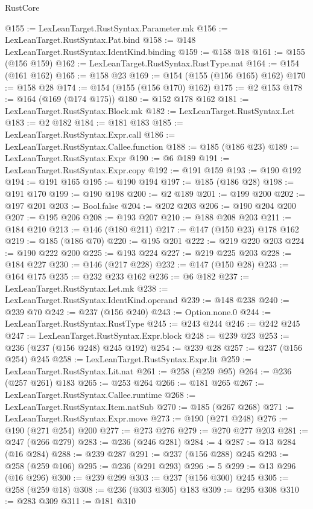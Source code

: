 \begin{lexlean}{RustCore}
\begin{coremodule}
@155 := LexLeanTarget.RustSyntax.Parameter.mk
@156 := LexLeanTarget.RustSyntax.Pat.bind
@158 := @148 LexLeanTarget.RustSyntax.IdentKind.binding
@159 := @158 @18
@161 := @155 (@156 @159)
@162 := LexLeanTarget.RustSyntax.RustType.nat
@164 := @154 (@161 @162)
@165 := @158 @23
@169 := @154 (@155 (@156 @165) @162)
@170 := @158 @28
@174 := @154 (@155 (@156 @170) @162)
@175 := @2 @153
@178 := @164 (@169 (@174 @175))
@180 := @152 @178 @162
@181 := LexLeanTarget.RustSyntax.Block.mk
@182 := LexLeanTarget.RustSyntax.Let
@183 := @2 @182
@184 := @181 @183
@185 := LexLeanTarget.RustSyntax.Expr.call
@186 := LexLeanTarget.RustSyntax.Callee.function
@188 := @185 (@186 @23)
@189 := LexLeanTarget.RustSyntax.Expr
@190 := @6 @189
@191 := LexLeanTarget.RustSyntax.Expr.copy
@192 := @191 @159
@193 := @190 @192
@194 := @191 @165
@195 := @190 @194
@197 := @185 (@186 @28)
@198 := @191 @170
@199 := @190 @198
@200 := @2 @189
@201 := @199 @200
@202 := @197 @201
@203 := Bool.false
@204 := @202 @203
@206 := @190 @204 @200
@207 := @195 @206
@208 := @193 @207
@210 := @188 @208 @203
@211 := @184 @210
@213 := @146 (@180 @211)
@217 := @147 (@150 @23) @178 @162
@219 := @185 (@186 @70)
@220 := @195 @201
@222 := @219 @220 @203
@224 := @190 @222 @200
@225 := @193 @224
@227 := @219 @225 @203
@228 := @184 @227
@230 := @146 (@217 @228)
@232 := @147 (@150 @28)
@233 := @164 @175
@235 := @232 @233 @162
@236 := @6 @182
@237 := LexLeanTarget.RustSyntax.Let.mk
@238 := LexLeanTarget.RustSyntax.IdentKind.operand
@239 := @148 @238
@240 := @239 @70
@242 := @237 (@156 @240)
@243 := Option.none.{0}
@244 := LexLeanTarget.RustSyntax.RustType
@245 := @243 @244
@246 := @242 @245
@247 := LexLeanTarget.RustSyntax.Expr.block
@248 := @239 @23
@253 := @236 (@237 (@156 @248) @245 @192)
@254 := @239 @28
@257 := @237 (@156 @254) @245
@258 := LexLeanTarget.RustSyntax.Expr.lit
@259 := LexLeanTarget.RustSyntax.Lit.nat
@261 := @258 (@259 @95)
@264 := @236 (@257 @261) @183
@265 := @253 @264
@266 := @181 @265
@267 := LexLeanTarget.RustSyntax.Callee.runtime
@268 := LexLeanTarget.RustSyntax.Item.natSub
@270 := @185 (@267 @268)
@271 := LexLeanTarget.RustSyntax.Expr.move
@273 := @190 (@271 @248)
@276 := @190 (@271 @254) @200
@277 := @273 @276
@279 := @270 @277 @203
@281 := @247 (@266 @279)
@283 := @236 (@246 @281)
@284 := 4
@287 := @13 @284 (@16 @284)
@288 := @239 @287
@291 := @237 (@156 @288) @245
@293 := @258 (@259 @106)
@295 := @236 (@291 @293)
@296 := 5
@299 := @13 @296 (@16 @296)
@300 := @239 @299
@303 := @237 (@156 @300) @245
@305 := @258 (@259 @18)
@308 := @236 (@303 @305) @183
@309 := @295 @308
@310 := @283 @309
@311 := @181 @310

\end{coremodule}
\end{lexlean}
